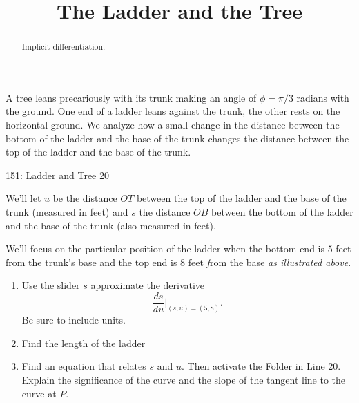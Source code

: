 \documentclass{ximera}
\title{The Ladder and the Tree}
\begin{document}
\begin{abstract}
Implicit differentiation.
\end{abstract}
\maketitle

\begin{question} \label{Q43hhbnhhnnzzz}

A tree leans precariously with its trunk making an angle of $\phi = \pi/3$ radians with the ground. One end of a ladder leans against the trunk, the other rests on the horizontal ground. We analyze how a small change in the distance between the bottom of the ladder and the base of the trunk changes the distance between the top of the ladder and the base of the trunk.


 
\begin{onlineOnly}
   \begin{center}
\end{center}
\end{onlineOnly}

\href{https://www.desmos.com/calculator/u8bxskxyhl}{151: Ladder and Tree 20}

We'll let $u$ be the distance $OT$ between the top of the ladder and the base of the trunk (measured in feet) and  $s$ the distance $OB$ between the bottom of the ladder and the base of the trunk (also measured in feet).



We'll focus on the particular position of the ladder when the bottom end is $5$ feet from the trunk's base and the top end is $8$ feet \emph from the base \emph{as illustrated above}.

\begin{enumerate}

\item Use the slider $s$ approximate the derivative
\[
\frac{ds}{du}\Big|_{(s,u) = (5,8)} .
\]
Be sure to include units.

\item Find the length of the ladder

\item Find an equation that relates $s$ and $u$. Then activate the Folder in Line 20. Explain the significance of the curve and the slope of the tangent line to the curve at $P$.


\end{enumerate}
\end{question}
\end{document}
